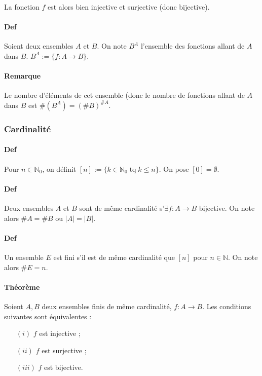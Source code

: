 \documentclass{article}
\DeclareMathOperator{\tq}{\text{ tq }}
\begin{document}
			La fonction $f$ est alors bien injective et surjective (donc bijective).
			
			\paragraph{Def} Soient deux ensembles $A$ et $B$. On note $B^A$ l'ensemble des fonctions allant de $A$ dans $B$. $B^A := \{f : A \to B\}$.
			
			\paragraph{Remarque} Le nombre d'éléments de cet ensemble (donc le nombre de fonctions allant de $A$ dans $B$ est $\#(B^A) = (\#B)^{\#A}$.
			
			\subsubsection{Cardinalité}
			
			\paragraph{Def} Pour $n \in \mathbb N_0$, on définit $[n] := \{k \in \mathbb N_0 \tq k \leq n\}$. On pose $[0] = \emptyset$.
			
			\paragraph{Def} Deux ensembles $A$ et $B$ sont de même cardinalité s'$\exists f : A \to B$ bijective. On note alors $\#A = \#B$ ou $|A| = |B|$.
			
			\paragraph{Def} Un ensemble $E$ est fini s'il est de même cardinalité que $[n]$ pour $n \in \mathbb N$. On note alors $\#E = n$.
			
			\paragraph{Théorème} Soient $A, B$ deux ensembles finis de même cardinalité, $f : A \to B$. Les conditions suivantes sont équivalentes :
			
			\begin{itemize}
				\item[$(i)$]   $f$ est injective ;
				\item[$(ii)$]  $f$ est surjective ;
				\item[$(iii)$] $f$ est bijective.
			\end{itemize}
			
\end{document}
